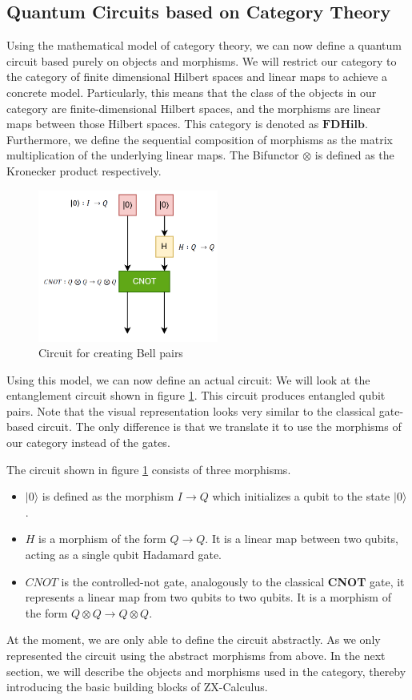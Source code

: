 \subsection{Quantum Circuits based on Category Theory}

Using the mathematical model of category theory, we can now define a quantum circuit based purely on objects and morphisms. We will restrict our category to the category of finite dimensional Hilbert spaces and linear maps to achieve a concrete model. Particularly, this means that the class of the objects in our category are finite-dimensional Hilbert spaces, and the morphisms are linear maps between those Hilbert spaces. This category is denoted as $\mathbf{FDHilb}$. Furthermore, we define the sequential composition of morphisms as the matrix multiplication of the underlying linear maps. The Bifunctor $\otimes$ is defined as the Kronecker product respectively.

\begin{figure}[h]
    \centering
    \includegraphics[height=5cm]{images/category-circuit.png}
    \caption{Circuit for creating Bell pairs}
    \label{fig:bell_circuit}
\end{figure}

Using this model, we can now define an actual circuit: We will look at the entanglement circuit shown in figure \ref{fig:bell_circuit}. This circuit produces entangled qubit pairs. Note that the visual representation looks very similar to the classical gate-based circuit. The only difference is that we translate it to use the morphisms of our category instead of the gates.


The circuit shown in figure \ref{fig:bell_circuit} consists of three morphisms.

\begin{itemize}
    \item $|0\rangle$ is defined as the morphism $I\rightarrow Q$ which initializes a qubit to the state $|0\rangle$.
    \item $H$ is a morphism of the form $Q\rightarrow Q$. It is a linear map between two qubits, acting as a single qubit Hadamard gate.
    \item $CNOT$ is the controlled-not gate, analogously to the classical \textbf{CNOT} gate, it represents a linear map from two qubits to two qubits. It is a morphism of the form $Q\otimes Q \rightarrow Q \otimes Q$.
\end{itemize}

At the moment, we are only able to define the circuit abstractly. As we only represented the circuit using the abstract morphisms from above. In the next section, we will describe the objects and morphisms used in the category, thereby introducing the basic building blocks of ZX-Calculus.

